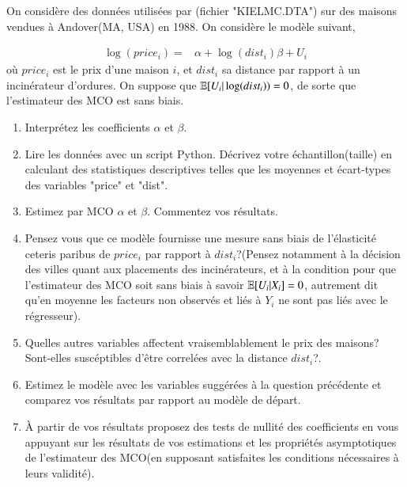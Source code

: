 \documentclass[10pt, reqno]{amsart}
\begin{document}
\medskip

On considère des données utilisées par \cite{KielMcCain1995}(fichier "KIELMC.DTA") sur des maisons vendues à Andover(MA, USA) en 1988. On considère le modèle suivant,

\begin{align*}
\log(price_i) =& \alpha + \log(dist_i)\beta + U_i
\end{align*}
où $price_i$ est le prix d'une maison $i$, et $dist_i$ sa distance par rapport à un incinérateur d'ordures. On suppose que $\mathbb{E}[U_i| \log(dist_i)) = 0$, de sorte que l'estimateur des MCO est sans biais.

 \begin{enumerate}
 \item Interprétez les coefficients $\alpha$ et $\beta$. 
\item Lire les données avec un script Python. Décrivez votre
  échantillon(taille) en calculant des statistiques descriptives
  telles que les moyennes et
  écart-types des variables "price" et "dist".
 \item Estimez par MCO $\alpha$ et $\beta$. Commentez vos résultats.
 \item Pensez vous que ce modèle fournisse une mesure sans biais de l'élasticité ceteris paribus de $price_i$ par rapport à $dist_i$?(Pensez  notamment à la décision des villes quant aux placements des incinérateurs, et à la condition pour que l'estimateur des MCO soit sans biais à savoir $\mathbb{E}[U_i|X_i] = 0$, autrement dit qu'en moyenne les facteurs non observés et liés à $Y_i$ ne sont pas liés avec le régresseur).
 \item Quelles autres variables affectent vraisemblablement le prix des
   maisons? Sont-elles suscéptibles d'être correlées avec la distance
   $dist_i$?.
  \item Estimez le modèle avec les variables suggérées à la question précédente et comparez vos résultats 
  par rapport au modèle de départ. 
  \item À partir de vos résultats proposez des tests de nullité des coefficients en vous appuyant sur 
  les résultats de vos estimations et les propriétés asymptotiques de l'estimateur des MCO(en supposant 
  satisfaites les conditions nécessaires à leurs validité).
 \end{enumerate}



 
\end{document}
